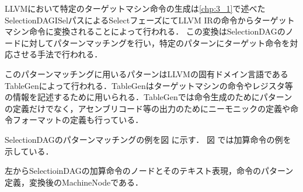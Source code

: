 
LLVMにおいて特定のターゲットマシン命令の生成は\ref{chp:3_1}で述べたSelectionDAGISelパスによるSelectフェーズにてLLVM IRの命令からターゲットマシン命令に変換されることによって行われる．
この変換はSelectionDAGのノードに対してパターンマッチングを行い，特定のパターンにターゲット命令を対応させる手法で行われる．

このパターンマッチングに用いるパターンはLLVMの固有ドメイン言語であるTableGenによって行われる．TableGenはターゲットマシンの命令やレジスタ等の情報を記述するために用いられる．TableGenでは命令生成のためにパターンの定義だけでなく，アセンブリコード等の出力のためにニーモニックの定義や命令フォーマットの定義も行っている．

SelectionDAGのパターンマッチングの例を図%
に示す．
図%
では加算命令の例を示している．

左からSelectioinDAGの加算命令のノードとそのテキスト表現，命令のパターン定義，変換後のMachineNodeである．

